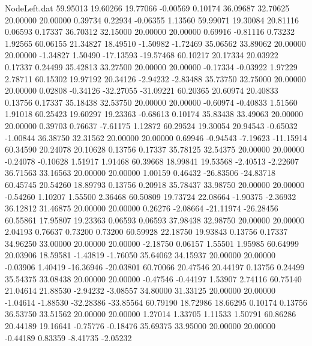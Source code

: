 \begin{filecontents}{NodeLeft.dat}
  59.95013   19.60266   19.77066    -0.00569    0.10174   36.09687   32.70625   20.00000   20.00000    0.39734    0.22934   -0.06355    1.13560
  59.99071   19.30084   20.81116     0.06593    0.17337   36.70312   32.15000   20.00000   20.00000    0.69916   -0.81116    0.73232    1.92565
  60.06155   21.34827   18.49510    -1.50982   -1.72469   35.06562   33.89062   20.00000   20.00000   -1.34827    1.50490  -17.13593  -19.57468
  60.10217   20.17334   20.03922     0.17337    0.24499   35.42813   33.27500   20.00000   20.00000   -0.17334   -0.03922    1.97229    2.78711
  60.15302   19.97192   20.34126    -2.94232   -2.83488   35.73750   32.75000   20.00000   20.00000    0.02808   -0.34126  -32.27055  -31.09221
  60.20365   20.60974   20.40833     0.13756    0.17337   35.18438   32.53750   20.00000   20.00000   -0.60974   -0.40833    1.51560    1.91018
  60.25423   19.60297   19.23363    -0.68613    0.10174   35.83438   33.49063   20.00000   20.00000    0.39703    0.76637   -7.61175    1.12872
  60.29524   19.30054   20.94543    -0.65032   -1.00844   36.38750   32.31562   20.00000   20.00000    0.69946   -0.94543   -7.19623  -11.15914
  60.34590   20.24078   20.10628     0.13756    0.17337   35.78125   32.54375   20.00000   20.00000   -0.24078   -0.10628    1.51917    1.91468
  60.39668   18.99841   19.53568    -2.40513   -2.22607   36.71563   33.16563   20.00000   20.00000    1.00159    0.46432  -26.83506  -24.83718
  60.45745   20.54260   18.89793     0.13756    0.20918   35.78437   33.98750   20.00000   20.00000   -0.54260    1.10207    1.55500    2.36468
  60.50809   19.73724   22.08664    -1.90375   -2.36932   36.12812   31.46875   20.00000   20.00000    0.26276   -2.08664  -21.11974  -26.28456
  60.55861   17.95807   19.23363     0.06593    0.06593   37.98438   32.98750   20.00000   20.00000    2.04193    0.76637    0.73200    0.73200
  60.59928   22.18750   19.93843     0.13756    0.17337   34.96250   33.00000   20.00000   20.00000   -2.18750    0.06157    1.55501    1.95985
  60.64999   20.03906   18.59581    -1.43819   -1.76050   35.64062   34.15937   20.00000   20.00000   -0.03906    1.40419  -16.36946  -20.03801
  60.70066   20.47546   20.44197     0.13756    0.24499   35.54375   33.08438   20.00000   20.00000   -0.47546   -0.44197    1.53907    2.74116
  60.75140   21.04614   21.88530    -2.94232   -3.08557   34.80000   31.33125   20.00000   20.00000   -1.04614   -1.88530  -32.28386  -33.85564
  60.79190   18.72986   18.66295     0.10174    0.13756   36.53750   33.51562   20.00000   20.00000    1.27014    1.33705    1.11533    1.50791
  60.86286   20.44189   19.16641    -0.75776   -0.18476   35.69375   33.95000   20.00000   20.00000   -0.44189    0.83359   -8.41735   -2.05232

\end{filecontents}
